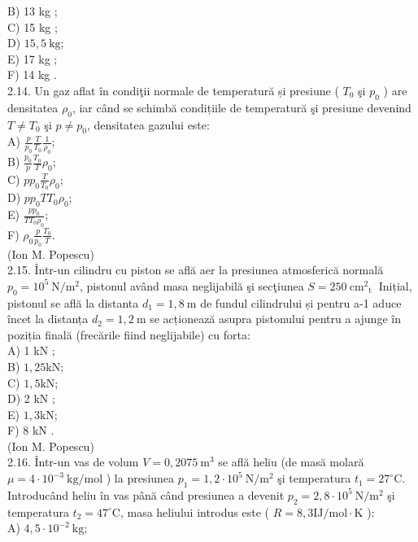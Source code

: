 \documentclass[10pt]{article}
\begin{document}
B) 13 kg ;\\
C) 15 kg ;\\
D) $15,5 \mathrm{~kg}$;\\
E) 17 kg ;\\
F) 14 kg .\\
2.14. Un gaz aflat în condiţii normale de temperatură și presiune ( $T_{0}$ şi $p_{0}$ ) are densitatea $\rho_{0}$, iar când se schimbă condițiile de temperatură şi presiune devenind $T \neq T_{0}$ şi $p \neq p_{0}$, densitatea gazului este:\\
A) $\frac{p}{p_{0}} \frac{T}{T_{0}} \frac{1}{\rho_{0}}$;\\
B) $\frac{p_{0}}{p} \frac{T_{0}}{T} \rho_{0}$;\\
C) $p p_{0} \frac{T}{T_{0}} \rho_{0}$;\\
D) $p p_{0} T T_{0} \rho_{0}$;\\
E) $\frac{p p_{0}}{T T_{0} \rho_{0}}$;\\
F) $\rho_{0} \frac{p}{p_{0}} \frac{T_{0}}{T}$.\\
(Ion M. Popescu)\\
2.15. Într-un cilindru cu piston se află aer la presiunea atmosferică normală $p_{0}=10^{5} \mathrm{~N} / \mathrm{m}^{2}$, pistonul având masa neglijabilă şi secţiunea $S=250 \mathrm{~cm}^{2}{ }_{\text {t }}$ Inițial, pistonul se află la distanta $d_{1}=1,8 \mathrm{~m}$ de fundul cilindrului și pentru a-1 aduce încet la distanța $d_{2}=1,2 \mathrm{~m}$ se acționează asupra pistonului pentru a ajunge în poziția finală (frecările fiind neglijabile) cu forta:\\
A) 1 kN ;\\
B) $1,25 \mathrm{kN}$;\\
C) $1,5 \mathrm{kN}$;\\
D) 2 kN ;\\
E) $1,3 \mathrm{kN}$;\\
F) 8 kN .\\
(Ion M. Popescu)\\
2.16. Într-un vas de volum $V=0,2075 \mathrm{~m}^{3}$ se află heliu (de masă molară $\mu=4 \cdot 10^{-3} \mathrm{~kg} / \mathrm{mol}$ ) la presiunea $p_{1}=1,2 \cdot 10^{5} \mathrm{~N} / \mathrm{m}^{2}$ şi temperatura $t_{1}=27^{\circ} \mathrm{C}$. Introducând heliu în vas până când presiunea a devenit $p_{2}=2,8 \cdot 10^{5} \mathrm{~N} / \mathrm{m}^{2}$ şi temperatura $t_{2}=47^{\circ} \mathrm{C}$, masa heliului introdus este ( $R=8,3 \mathrm{IJ} / \mathrm{mol} \cdot \mathrm{K}$ ):\\
A) $4,5 \cdot 10^{-2} \mathrm{~kg}$;\\
\end{document}
